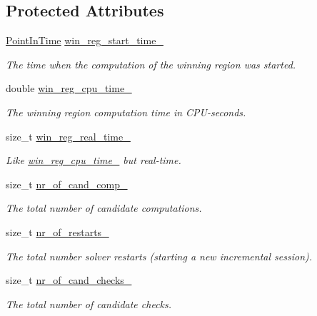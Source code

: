 \subsection*{Protected Attributes}
\begin{DoxyCompactItemize}
\item 
\hyperlink{Stopwatch_8h_af3a9f634f27bed7e98dbc23e5c6f807d}{Point\-In\-Time} \hyperlink{classLearnStatisticsSAT_a04c8091b3380c8d756d40aabeefbfbe1}{win\-\_\-reg\-\_\-start\-\_\-time\-\_\-}
\begin{DoxyCompactList}\small\item\em The time when the computation of the winning region was started. \end{DoxyCompactList}\item 
double \hyperlink{classLearnStatisticsSAT_af9823be5155743223790ae01b91b7ca8}{win\-\_\-reg\-\_\-cpu\-\_\-time\-\_\-}
\begin{DoxyCompactList}\small\item\em The winning region computation time in C\-P\-U-\/seconds. \end{DoxyCompactList}\item 
size\-\_\-t \hyperlink{classLearnStatisticsSAT_a97f7a6ccfc2d6677ae8a6c16dddd6b71}{win\-\_\-reg\-\_\-real\-\_\-time\-\_\-}
\begin{DoxyCompactList}\small\item\em Like \hyperlink{classLearnStatisticsSAT_af9823be5155743223790ae01b91b7ca8}{win\-\_\-reg\-\_\-cpu\-\_\-time\-\_\-} but real-\/time. \end{DoxyCompactList}\item 
size\-\_\-t \hyperlink{classLearnStatisticsSAT_a02de895c31e4c58396d5f07154e21561}{nr\-\_\-of\-\_\-cand\-\_\-comp\-\_\-}
\begin{DoxyCompactList}\small\item\em The total number of candidate computations. \end{DoxyCompactList}\item 
size\-\_\-t \hyperlink{classLearnStatisticsSAT_a07c8eee4a3c82762e3a94e38440f3adb}{nr\-\_\-of\-\_\-restarts\-\_\-}
\begin{DoxyCompactList}\small\item\em The total number solver restarts (starting a new incremental session). \end{DoxyCompactList}\item 
size\-\_\-t \hyperlink{classLearnStatisticsSAT_a1c3b6dff92cbcec06c944606c3555b64}{nr\-\_\-of\-\_\-cand\-\_\-checks\-\_\-}
\begin{DoxyCompactList}\small\item\em The total number of candidate checks. \end{DoxyCompactList}\item 

\end{DoxyCompactItemize}
